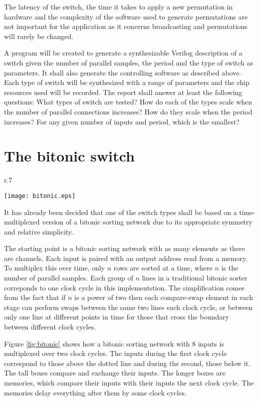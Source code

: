 \documentclass[12pt]{report}
\begin{document}
The latency of the switch, the time it takes to apply a new permutation in
hardware and the complexity of the software used to generate permutations are
not important for the application as it concerns broadcasting and permutations
will rarely be changed.

A program will be created to generate a synthesizable Verilog description of
a switch given the number of parallel samples, the period and the type of
switch as parameters. It shall also generate the controlling software as
described above. Each type of switch will be synthesized with a range of
parameters and the chip resources used will be recorded. The report shall
answer at least the following questions: What types of switch are tested? How
do each of the types scale when the number of parallel connections increases?
How do they scale when the period increases? For any given number of inputs and
period, which is the smallest?

\section{The bitonic switch}

\begin{wrapfigure}{r}{.7\textwidth}
\begin{center}
\texttt{[image: bitonic.eps]}
\end{center}
\caption{Bitonic sorter with 8 inputs. The arrows show where the larger number
	goes.}
\label{fig:bitonic}
\end{wrapfigure}

It has already been decided that one of the switch types shall be based on a
time-multiplexed version of a bitonic sorting network due to its appropriate
symmetry and relative simplicity.

The starting point is a bitonic sorting network with as many elements as there
are channels. Each input is paired with an output address read from a memory.
To multiplex this over time, only $n$ rows are sorted at a time, where $n$ is
the number of parallel samples. Each group of $n$ lines in a traditional
bitonic sorter correponds to one clock cycle in this implementstion. The
simplification comes from the fact that if $n$ is a power of two then each
compare-swap element in each stage can perform swaps between the same two
lines each clock cycle, or between only one line at different points in time
for those that cross the boundary between different clock cycles.

Figure \ref{fig:bitonic} shows how a bitonic sorting network with 8 inputs is
multiplexed over two clock cycles. The inputs during the first clock cycle
correspond to those above the dotted line and during the second, those below it.
The tall boxes compare and exchange their inputs. The longer boxes are memories,
which compare their inputs with their inputs the next clock cycle. The memories
delay everything after them by some clock cycles.
\end{document}
